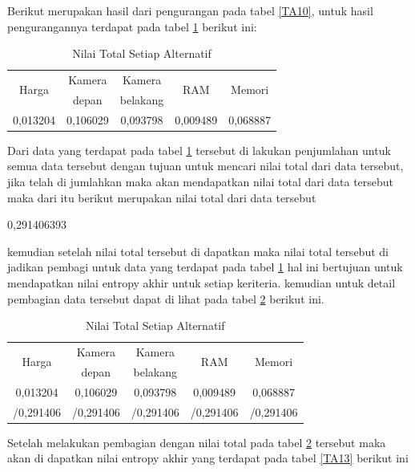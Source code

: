Berikut merupakan hasil dari pengurangan pada tabel \ref{TA10}, untuk hasil pengurangannya terdapat pada tabel \ref{TA11} berikut ini:


\begin{table}[h]
\caption{Nilai Total Setiap Alternatif}
\centering
\begin{tabular}{|c|c|c|c|c|}
\hline
\multirow{2}{*}{ Harga}& Kamera & Kamera&\multirow{2}{*}{RAM}& \multirow{2}{*}{Memori}\\
& depan & belakang & &\\
\hline
0,013204&0,106029&0,093798&0,009489&0,068887\\
\hline

\end{tabular}
\label{TA11}
\end{table}

Dari data yang terdapat pada tabel \ref{TA11} tersebut di lakukan penjumlahan untuk semua data tersebut dengan tujuan untuk mencari nilai total dari data tersebut, jika telah di jumlahkan maka akan mendapatkan nilai total dari data tersebut maka dari itu berikut merupakan nilai total dari data tersebut\par

0,291406393

kemudian setelah nilai total tersebut di dapatkan maka nilai total tersebut di jadikan pembagi untuk data yang terdapat pada tabel \ref{TA11} hal ini bertujuan untuk mendapatkan nilai entropy akhir untuk setiap keriteria. kemudian untuk detail pembagian data tersebut dapat di lihat pada tabel \ref{TA12} berikut ini.

\begin{table}[h]
\caption{Nilai Total Setiap Alternatif}
\centering
\begin{tabular}{|c|c|c|c|c|}
\hline
\multirow{2}{*}{ Harga}& Kamera & Kamera&\multirow{2}{*}{RAM}& \multirow{2}{*}{Memori}\\
& depan & belakang & &\\
\hline
0,013204&0,106029&0,093798&0,009489&0,068887\\
/0,291406&/0,291406&/0,291406&/0,291406&/0,291406\\
\hline
\end{tabular}
\label{TA12}
\end{table}

Setelah melakukan pembagian dengan nilai total pada tabel \ref{TA12} tersebut maka akan di dapatkan nilai entropy akhir yang terdapat pada tabel \ref{TA13} berikut ini



